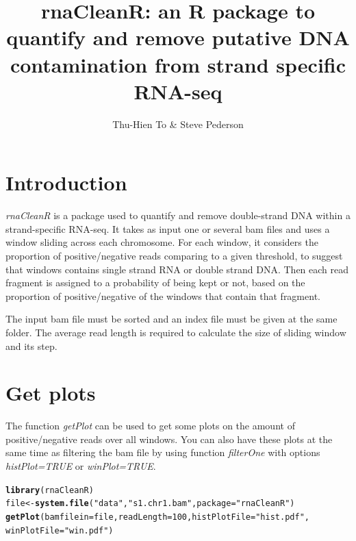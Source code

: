 \documentclass{article}\usepackage[]{graphicx}\usepackage[]{color}
\makeatletter
\newcommand{\hlnum}[1]{\textcolor[rgb]{0.686,0.059,0.569}{#1}}%
\newcommand{\hlstr}[1]{\textcolor[rgb]{0.192,0.494,0.8}{#1}}%
\newcommand{\hlstd}[1]{\textcolor[rgb]{0.345,0.345,0.345}{#1}}%
\newcommand{\hlkwb}[1]{\textcolor[rgb]{0.69,0.353,0.396}{#1}}%
\newcommand{\hlkwc}[1]{\textcolor[rgb]{0.333,0.667,0.333}{#1}}%
\newcommand{\hlkwd}[1]{\textcolor[rgb]{0.737,0.353,0.396}{\textbf{#1}}}%
\newenvironment{kframe}{%
 \def\at@end@of@kframe{}%
 \ifinner\ifhmode%
  \def\at@end@of@kframe{\end{minipage}}%
  \begin{minipage}{\columnwidth}%
 \fi\fi%
 \def\FrameCommand##1{\hskip\@totalleftmargin \hskip-\fboxsep
 \colorbox{shadecolor}{##1}\hskip-\fboxsep
     \hskip-\linewidth \hskip-\@totalleftmargin \hskip\columnwidth}%
 \MakeFramed {\advance\hsize-\width
   \@totalleftmargin\z@ \linewidth\hsize
   \@setminipage}}%
 {\par\unskip\endMakeFramed%
 \at@end@of@kframe}
\newenvironment{knitrout}{}{} %
\makeatother
\begin{document}
\title{rnaCleanR: an R package to quantify and remove putative DNA contamination from strand specific RNA-seq}
\author{Thu-Hien To & Steve Pederson}
\maketitle

\tableofcontents

\clearpage

\section{Introduction}

\textit{rnaCleanR} is a package used to quantify and remove double-strand DNA within a strand-specific RNA-seq. It takes as input one or several bam files and uses a window sliding across each chromosome. For each window, it considers the proportion of positive/negative reads comparing to a given threshold, to suggest that  windows contains single strand RNA or double strand DNA. Then each read fragment is assigned to a probability of being kept or not, based on the proportion of positive/negative of the windows that contain that fragment.

The input bam file must be sorted and an index file must be given at the same folder. The average read length is required to calculate the size of sliding window and its step. 


\section{Get plots}

The function \textit{getPlot} can be used to get some plots on the amount of positive/negative reads over all windows. You can also have these plots at the same time as filtering the bam file by using function \textit{filterOne} with options \textit{histPlot=TRUE} or \textit{winPlot=TRUE}.


\begin{knitrout}
\color{fgcolor}\begin{kframe}
\begin{alltt}
\hlkwd{library}\hlstd{(rnaCleanR)}
\hlstd{file} \hlkwb{<-} \hlkwd{system.file}\hlstd{(}\hlstr{"data"}\hlstd{,}\hlstr{"s1.chr1.bam"}\hlstd{,}\hlkwc{package} \hlstd{=} \hlstr{"rnaCleanR"}\hlstd{)}
\hlkwd{getPlot}\hlstd{(}\hlkwc{bamfilein} \hlstd{= file,}\hlkwc{readLength} \hlstd{=} \hlnum{100}\hlstd{,}\hlkwc{histPlotFile} \hlstd{=} \hlstr{"hist.pdf"}\hlstd{,}
        \hlkwc{winPlotFile} \hlstd{=} \hlstr{"win.pdf"}\hlstd{)}
\end{alltt}
\end{kframe}
\end{knitrout}
\end{document}
